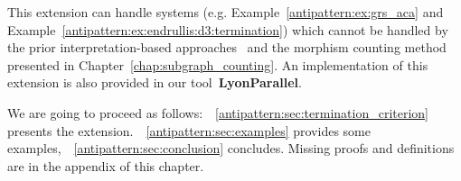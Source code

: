 This extension can handle systems (e.g. Example~\ref{antipattern:ex:grs_aca} and Example~\ref{antipattern:ex:endrullis:d3:termination}) which cannot be handled by the
prior interpretation-based approaches~\cite{zantema2014termination,bruggink2014termination,bruggink2015proving,endrullis2024generalized_arxiv_v2,overbeek2024termination_lmcs} and the morphism counting method presented in Chapter~\ref{chap:subgraph_counting}.
An implementation of this extension is also provided in our tool~\textbf{LyonParallel}.
  
We are going to proceed as follows:~\textsection~\ref{antipattern:sec:termination_criterion} presents the extension.~\textsection~\ref{antipattern:sec:examples} provides some examples,~\textsection~\ref{antipattern:sec:conclusion} concludes. Missing proofs and definitions are in the appendix of this chapter.